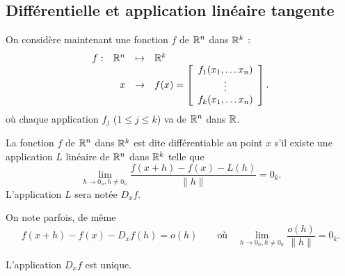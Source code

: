 \subsection{Différentielle et application linéaire tangente} 

On considère maintenant une fonction $f$ de $\mathbb{R}^n$ dans $\mathbb{R}^k$ : 
$$
\begin{array}{rrcl}
  f : & \mathbb{R}^n & \mapsto & \mathbb{R}^k \\
  & x & \to & f(x) = \left[\begin{array}{c}
      f_1(x_1, \dots x_n) \\ \vdots \\ f_k(x_1, \dots x_n)
    \end{array}\right].
\end{array}
$$
où chaque application $f_j$ ($1 \leq j \leq k$) va de $\mathbb{R}^n$ dans $\mathbb{R}$.

\begin{definition}[Différentiabilité] \label{def:differentiabilité}
  La fonction $f$ de $\mathbb{R}^n$ dans $\mathbb{R}^k$ est dite différentiable au point $x$ s'il existe une application $L$ linéaire de $\mathbb{R}^n$ dans $\mathbb{R}^k$ telle que
  $$
  \lim_{h\to 0_n, h \neq 0_n} \frac{f(x+h) - f(x) - L(h)}{\|h\|} = 0_k.
  $$
  L'application $L$ sera notée $D_x f$.
\end{definition}

\remark
On note parfois, de même 
$$
f(x+h) - f(x) - D_xf(h) = o(h)
\qquad \text{où} \quad
\lim_{h\to 0_n, h \neq 0_n} \frac{o(h)}{\|h\|} = 0_k.
$$

\begin{proposition} \label{prop:uniciteApplicationLineaireTangente}
  L'application $D_x f$ est unique.
\end{proposition}

